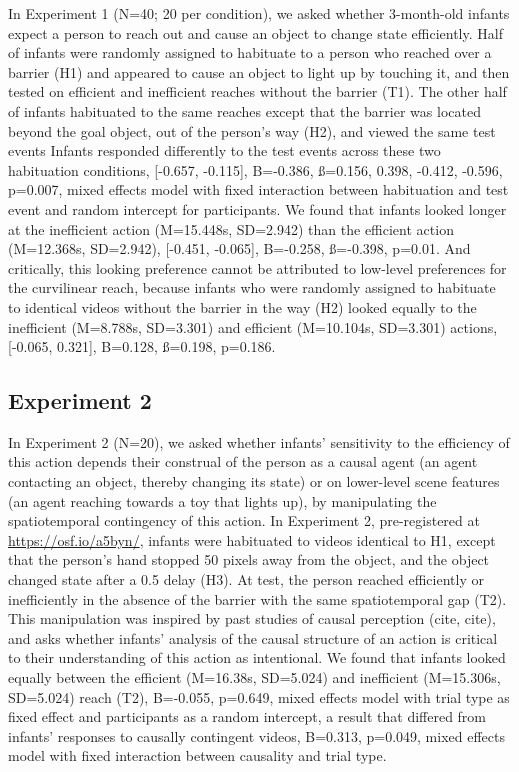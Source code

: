 \documentclass[]{article}
\begin{document}
In Experiment 1 (N=40; 20 per condition), we asked whether 3-month-old
infants expect a person to reach out and cause an object to change state
efficiently. Half of infants were randomly assigned to habituate to a
person who reached over a barrier (H1) and appeared to cause an object
to light up by touching it, and then tested on efficient and inefficient
reaches without the barrier (T1). The other half of infants habituated
to the same reaches except that the barrier was located beyond the goal
object, out of the person's way (H2), and viewed the same test events
Infants responded differently to the test events across these two
habituation conditions, {[}-0.657, -0.115{]}, B=-0.386, ß=0.156, 0.398,
-0.412, -0.596, p=0.007, mixed effects model with fixed interaction
between habituation and test event and random intercept for
participants. We found that infants looked longer at the inefficient
action (M=15.448s, SD=2.942) than the efficient action (M=12.368s,
SD=2.942), {[}-0.451, -0.065{]}, B=-0.258, ß=-0.398, p=0.01. And
critically, this looking preference cannot be attributed to low-level
preferences for the curvilinear reach, because infants who were randomly
assigned to habituate to identical videos without the barrier in the way
(H2) looked equally to the inefficient (M=8.788s, SD=3.301) and
efficient (M=10.104s, SD=3.301) actions, {[}-0.065, 0.321{]}, B=0.128,
ß=0.198, p=0.186.

\subsection{Experiment 2}\label{experiment-2}

In Experiment 2 (N=20), we asked whether infants' sensitivity to the
efficiency of this action depends their construal of the person as a
causal agent (an agent contacting an object, thereby changing its state)
or on lower-level scene features (an agent reaching towards a toy that
lights up), by manipulating the spatiotemporal contingency of this
action. In Experiment 2, pre-registered at \url{https://osf.io/a5byn/},
infants were habituated to videos identical to H1, except that the
person's hand stopped 50 pixels away from the object, and the object
changed state after a 0.5 delay (H3). At test, the person reached
efficiently or inefficiently in the absence of the barrier with the same
spatiotemporal gap (T2). This manipulation was inspired by past studies
of causal perception (cite, cite), and asks whether infants' analysis of
the causal structure of an action is critical to their understanding of
this action as intentional. We found that infants looked equally between
the efficient (M=16.38s, SD=5.024) and inefficient (M=15.306s, SD=5.024)
reach (T2), B=-0.055, p=0.649, mixed effects model with trial type as
fixed effect and participants as a random intercept, a result that
differed from infants' responses to causally contingent videos, B=0.313,
p=0.049, mixed effects model with fixed interaction between causality
and trial type.
\end{document}
